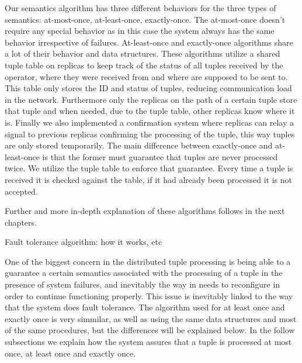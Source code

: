 \documentclass[times, 10pt,twocolumn]{article}
\begin{document}
	Our semantics algorithm has three different behaviors for the three types 
of semantics: at-most-once, at-least-once, exactly-once. The at-most-once
doesn't require any special behavior as in this case the system always has the same 
behavior irrespective of failures. At-least-once and exactly-once algorithms share 
a lot of their behavior and data structures. These algorithms utilize a shared tuple table
on replicas to keep track of the status of all tuples received by the operator, 
where they were received from and where are supposed to be sent to. This
table only stores the ID and status of tuples, reducing communication load in the
network. Furthermore only the replicas on the path of a certain tuple store that tuple 
and when needed, due to the tuple table, other replicas know where it is. Finally we also
implemented a confirmation system where replicas can relay a signal to previous replicas
confirming the processing of the tuple, this way tuples are only stored temporarily. 
The main difference between exactly-once and at-least-once is that the former 
must guarantee that tuples are never processed twice. We utilize the tuple table
to enforce that guarantee. Every time a tuple is received it is checked against the 
table, if it had already been processed it is not accepted. 

	Further and more in-depth explanation of these algorithms follows in the next chapters.


Fault tolerance algorithm: how it works, etc


One of the biggest concern in the distributed tuple processing is being
able to a guarantee a certain semantics associated with the processing of
a tuple in the presence of system failures, and inevitably the way in
needs to reconfigure in order to continue functioning properly. This issue
is inevitably linked to the way that the system does fault tolerance. The
algorithm used for at least once and exactly once is very simmilar, as
well as using the same data structures and most of the same procedures,
but the differences will be explained below. In the follow subsections we
explain how the system assures that a tuple is processed at most once, at
least once and exactly once.

\end{document}
